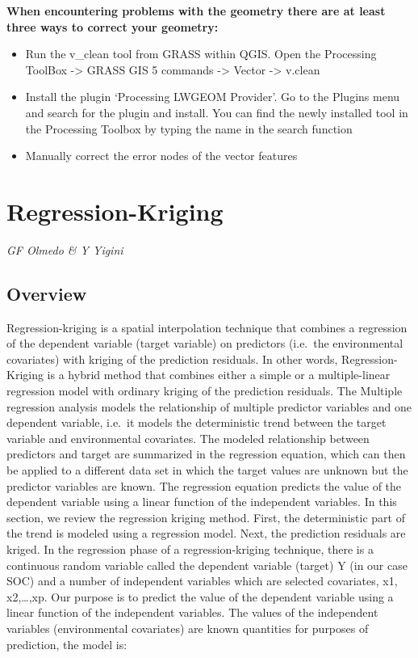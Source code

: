 \documentclass[10pt,b5paper,]{book}
\providecommand{\tightlist}{%
  \setlength{\itemsep}{0pt}\setlength{\parskip}{0pt}}
\theoremstyle{definition}
\theoremstyle{definition}
\theoremstyle{definition}
\theoremstyle{remark}
\begin{document}
\textbf{When encountering problems with the geometry there are at least
three ways to correct your geometry:}

\begin{itemize}
\tightlist
\item
  Run the v\_clean tool from GRASS within QGIS. Open the Processing
  ToolBox -\textgreater{} GRASS GIS 5 commands -\textgreater{} Vector
  -\textgreater{} v.clean
\item
  Install the plugin `Processing LWGEOM Provider'. Go to the Plugins
  menu and search for the plugin and install. You can find the newly
  installed tool in the Processing Toolbox by typing the name in the
  search function
\item
  Manually correct the error nodes of the vector features
\end{itemize}

\clearpage

\hypertarget{RK}{%
\section{Regression-Kriging}\label{RK}}

\emph{GF Olmedo \& Y Yigini}

\hypertarget{overview-1}{%
\subsection{Overview}\label{overview-1}}

Regression-kriging is a spatial interpolation technique that combines a
regression of the dependent variable (target variable) on predictors
(i.e.~the environmental covariates) with kriging of the prediction
residuals. In other words, Regression-Kriging is a hybrid method that
combines either a simple or a multiple-linear regression model with
ordinary kriging of the prediction residuals. The Multiple regression
analysis models the relationship of multiple predictor variables and one
dependent variable, i.e.~it models the deterministic trend between the
target variable and environmental covariates. The modeled relationship
between predictors and target are summarized in the regression equation,
which can then be applied to a different data set in which the target
values are unknown but the predictor variables are known. The regression
equation predicts the value of the dependent variable using a linear
function of the independent variables. In this section, we review the
regression kriging method. First, the deterministic part of the trend is
modeled using a regression model. Next, the prediction residuals are
kriged. In the regression phase of a regression-kriging technique, there
is a continuous random variable called the dependent variable (target) Y
(in our case SOC) and a number of independent variables which are
selected covariates, x1, x2,\ldots{},xp. Our purpose is to predict the
value of the dependent variable using a linear function of the
independent variables. The values of the independent variables
(environmental covariates) are known quantities for purposes of
prediction, the model is:
\end{document}
